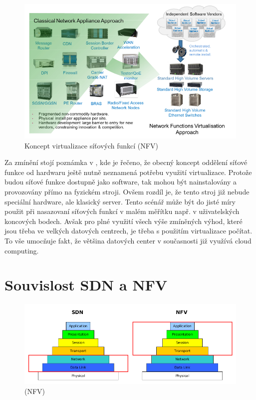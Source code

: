 \begin{figure}[h]
\begin{centering}
\includegraphics[scale=0.5]{images/vize_NFV}
\par\end{centering}
\caption{Koncept virtualizace síťových funkcí (NFV)\label{fig:vize_NFV}}
\end{figure}

Za zmínění stojí poznámka v \cite{NFVState}, kde je řečeno, že obecný koncept oddělení síťové funkce od hardwaru ještě nutně neznamená potřebu využití virtualizace. Protože budou síťové funkce dostupně jako software, tak mohou být nainstalovány a provozovány přímo na fyzickém stroji. Ovšem rozdíl je, že tento stroj již nebude speciální hardware, ale klasický server. Tento scénář může být do jisté míry použit při nasazovaní síťových funkcí v malém měřítku např. v uživatelských koncových bodech. Avšak pro plné využití všech výše zmíněných výhod, které jsou třeba ve velkých datových centrech, je třeba s použitím virtualizace počítat. To vše umocňuje fakt, že většina datových center v současnosti již využívá cloud computing. 

\section{Souvislost SDN a NFV}

\begin{figure}[h]
\begin{centering}
\includegraphics[scale=0.5]{images/sdn_nfv}
\par\end{centering}
\caption{ (NFV)\label{fig:vize_NFV}}
\end{figure}


